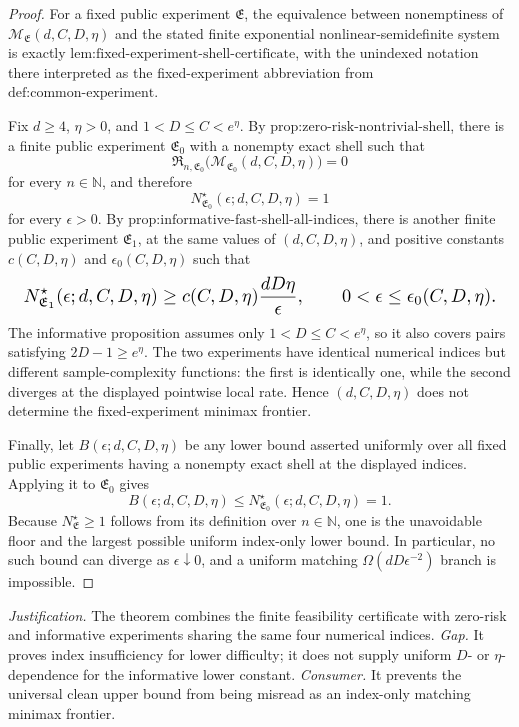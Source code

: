\documentclass{article}
\begin{document}
\begin{proof}
For a fixed public experiment \(\mathfrak E\), the equivalence between nonemptiness of \(\mathcal M_{\mathfrak E}(d,C,D,\eta)\) and the stated finite exponential nonlinear-semidefinite system is exactly \(\text{lem:fixed-experiment-shell-certificate}\), with the unindexed notation there interpreted as the fixed-experiment abbreviation from \(\text{def:common-experiment}\).

Fix \(d\ge4\), \(\eta>0\), and \(1<D\le C<e^\eta\). By \(\text{prop:zero-risk-nontrivial-shell}\), there is a finite public experiment \(\mathfrak E_0\) with a nonempty exact shell such that
\[
\mathfrak R_{n,\mathfrak E_0}\bigl(\mathcal M_{\mathfrak E_0}(d,C,D,\eta)\bigr)=0
\]
for every \(n\in\mathbb N\), and therefore
\[
N^\star_{\mathfrak E_0}(\epsilon;d,C,D,\eta)=1
\]
for every \(\epsilon>0\). By \(\text{prop:informative-fast-shell-all-indices}\), there is another finite public experiment \(\mathfrak E_1\), at the same values of \((d,C,D,\eta)\), and positive constants \(c(C,D,\eta)\) and \(\epsilon_0(C,D,\eta)\) such that
\[
\makebox[\linewidth][c]{\resizebox{0.98\linewidth}{!}{\(\displaystyle N^\star_{\mathfrak E_1}(\epsilon;d,C,D,\eta)
\ge c(C,D,\eta)\frac{dD\eta}{\epsilon},
\qquad 0<\epsilon\le\epsilon_0(C,D,\eta).\)}}
\]
The informative proposition assumes only \(1<D\le C<e^\eta\), so it also covers pairs satisfying \(2D-1\ge e^\eta\). The two experiments have identical numerical indices but different sample-complexity functions: the first is identically one, while the second diverges at the displayed pointwise local rate. Hence \((d,C,D,\eta)\) does not determine the fixed-experiment minimax frontier.

Finally, let \(B(\epsilon;d,C,D,\eta)\) be any lower bound asserted uniformly over all fixed public experiments having a nonempty exact shell at the displayed indices. Applying it to \(\mathfrak E_0\) gives
\[
B(\epsilon;d,C,D,\eta)
\le N^\star_{\mathfrak E_0}(\epsilon;d,C,D,\eta)=1.
\]
Because \(N^\star_{\mathfrak E}\ge1\) follows from its definition over \(n\in\mathbb N\), one is the unavoidable floor and the largest possible uniform index-only lower bound. In particular, no such bound can diverge as \(\epsilon\downarrow0\), and a uniform matching \(\Omega(dD\epsilon^{-2})\) branch is impossible.
\end{proof}
\par\smallskip\noindent \textit{Justification.} The theorem combines the finite feasibility certificate with zero-risk and informative experiments sharing the same four numerical indices. \textit{Gap.} It proves index insufficiency for lower difficulty; it does not supply uniform \(D\)- or \(\eta\)-dependence for the informative lower constant. \textit{Consumer.} It prevents the universal clean upper bound from being misread as an index-only matching minimax frontier.
\end{document}
